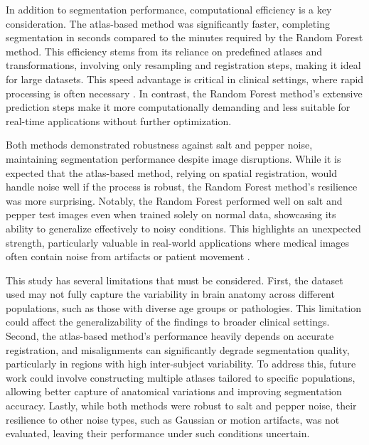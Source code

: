 In addition to segmentation performance, computational efficiency is a key consideration. The atlas-based method was significantly faster, completing segmentation in seconds compared to the minutes required by the Random Forest method. This efficiency stems from its reliance on predefined atlases and transformations, involving only resampling and registration steps, making it ideal for large datasets. This speed advantage is critical in clinical settings, where rapid processing is often necessary \cite{b19}. In contrast, the Random Forest method’s extensive prediction steps make it more computationally demanding and less suitable for real-time applications without further optimization.

Both methods demonstrated robustness against salt and pepper noise, maintaining segmentation performance despite image disruptions. While it is expected that the atlas-based method, relying on spatial registration, would handle noise well if the process is robust, the Random Forest method's resilience was more surprising. Notably, the Random Forest performed well on salt and pepper test images even when trained solely on normal data, showcasing its ability to generalize effectively to noisy conditions. This highlights an unexpected strength, particularly valuable in real-world applications where medical images often contain noise from artifacts or patient movement \cite{b20}.

This study has several limitations that must be considered. First, the dataset used may not fully capture the variability in brain anatomy across different populations, such as those with diverse age groups or pathologies. This limitation could affect the generalizability of the findings to broader clinical settings. Second, the atlas-based method’s performance heavily depends on accurate registration, and misalignments can significantly degrade segmentation quality, particularly in regions with high inter-subject variability. To address this, future work could involve constructing multiple atlases tailored to specific populations, allowing better capture of anatomical variations and improving segmentation accuracy. Lastly, while both methods were robust to salt and pepper noise, their resilience to other noise types, such as Gaussian or motion artifacts, was not evaluated, leaving their performance under such conditions uncertain.